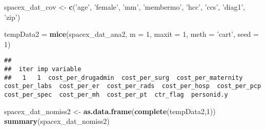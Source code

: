 \documentclass[]{article}
\newenvironment{Shaded}{\begin{snugshade}}{\end{snugshade}}
\newcommand{\KeywordTok}[1]{\textcolor[rgb]{0.13,0.29,0.53}{\textbf{#1}}}
\newcommand{\DataTypeTok}[1]{\textcolor[rgb]{0.13,0.29,0.53}{#1}}
\newcommand{\DecValTok}[1]{\textcolor[rgb]{0.00,0.00,0.81}{#1}}
\newcommand{\StringTok}[1]{\textcolor[rgb]{0.31,0.60,0.02}{#1}}
\newcommand{\NormalTok}[1]{#1}
\begin{document}
\begin{Shaded}
\begin{Highlighting}[]
\NormalTok{spacex_dat_cov <-}\StringTok{ }\KeywordTok{c}\NormalTok{(}\StringTok{'age'}\NormalTok{, }\StringTok{'female'}\NormalTok{, }\StringTok{'mm'}\NormalTok{, }\StringTok{'membermo'}\NormalTok{, }\StringTok{'hcc'}\NormalTok{, }\StringTok{'ccs'}\NormalTok{, }\StringTok{'diag1'}\NormalTok{,  }\StringTok{'zip'}\NormalTok{)}

\NormalTok{tempData2 =}\StringTok{ }\KeywordTok{mice}\NormalTok{(spacex_dat_ana2, }\DataTypeTok{m =} \DecValTok{1}\NormalTok{, }\DataTypeTok{maxit =} \DecValTok{1}\NormalTok{, }\DataTypeTok{meth =} \StringTok{'cart'}\NormalTok{, }\DataTypeTok{seed =} \DecValTok{1}\NormalTok{)}
\end{Highlighting}
\end{Shaded}

\begin{verbatim}
## 
##  iter imp variable
##   1   1  cost_per_drugadmin  cost_per_surg  cost_per_maternity  cost_per_labs  cost_per_er  cost_per_rads  cost_per_hosp  cost_per_pcp  cost_per_spec  cost_per_mh  cost_per_pt  ctr_flag  personid.y
\end{verbatim}

\begin{Shaded}
\begin{Highlighting}[]
\NormalTok{spacex_dat_nomiss2 <-}\StringTok{ }\KeywordTok{as.data.frame}\NormalTok{(}\KeywordTok{complete}\NormalTok{(tempData2,}\DecValTok{1}\NormalTok{))}
\KeywordTok{summary}\NormalTok{(spacex_dat_nomiss2)}
\end{Highlighting}
\end{Shaded}
\end{document}
